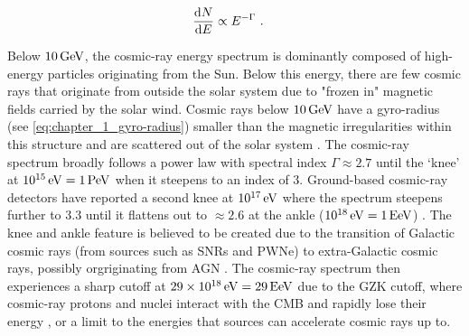 \begin{equation}
    \begin{aligned}
    \dv{N}{E}&\propto E^{-\Gamma}\text{ .}
    \end{aligned}
\end{equation}

Below $10\,\GeV$, the cosmic-ray energy spectrum is dominantly composed of high-energy particles originating from the Sun. Below this energy, there are few cosmic rays that originate from outside the solar system due to "frozen in" magnetic fields carried by the solar wind. Cosmic rays below $10\,\GeV$ have a gyro-radius (see \autoref{eq:chapter_1_gyro-radius}) smaller than the magnetic irregularities within this structure and are scattered out of the solar system \citep{2002cra..book.....S}. The cosmic-ray spectrum broadly follows a power law with spectral index $\Gamma\approx 2.7$ until the `knee' at $10^{15}\,\eV=1\,\PeV$ when it steepens to an index of $3$. Ground-based cosmic-ray detectors have reported a second knee at $10^{17}\,\eV$ where the spectrum steepens further to $3.3$ until it flattens out to $\approx 2.6$ at the ankle ($10^{18}\,\eV=1\,\si{E\electronvolt}$) \citep{2008ApJ...678.1165A,2010PhLB..685..239A, 2013PhRvD..87h1101A, 2013PhRvD..88d2004A,2013ApJ...768L...1A}. The knee and ankle feature is believed to be created due to the transition of Galactic cosmic rays (from sources such as SNRs and PWNe) to extra-Galactic cosmic rays, possibly orgriginating from AGN \citep{2016A&A...595A..33T}. The cosmic-ray spectrum then experiences a sharp cutoff at $29\times10^{18}\,\eV = 29\,\si{E\electronvolt}$ due to the GZK cutoff, where cosmic-ray protons and nuclei interact with the CMB and rapidly lose their energy \citep{1966PhRvL..16..748G,1966JETPL...4...78Z}, or a limit to the energies that sources can accelerate cosmic rays up to.


